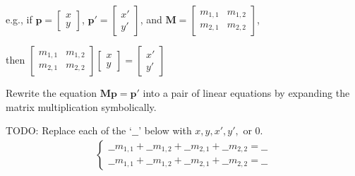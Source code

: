 \documentclass{csci1430}
\begin{document}
\begin{question}[points=10,drawbox=false]
e.g., if 
$\mathbf{p} = \begin{bmatrix} x \\ y \end{bmatrix}$, 
$\mathbf{p'} = \begin{bmatrix} x' \\ y' \end{bmatrix}$,
and 
$\mathbf{M} = \begin{bmatrix} m_{1,1} & m_{1,2} \\ m_{2,1} & m_{2,2} \end{bmatrix}$,

then $\begin{bmatrix} m_{1,1} & m_{1,2} \\ m_{2,1} & m_{2,2} \end{bmatrix} \begin{bmatrix} x \\ y \end{bmatrix} = \begin{bmatrix} x' \\ y'  \end{bmatrix}$

\end{question}

\begin{subquestion}[points=1]
Rewrite the equation $\mathbf{M}\mathbf{p} = \mathbf{p'}$ into a pair of linear equations by expanding the matrix multiplication symbolically.
\end{subquestion}

\begin{answer}
TODO: Replace each of the `$\_\_$' below with $x, y, x', y',$ or $0$.
\begin{align*}
\begin{cases}
    \_\_m_{1,1} + \_\_m_{1,2} + \_\_m_{2,1} + \_\_m_{2,2} = \_\_
    \\\_\_m_{1,1} + \_\_m_{1,2} + \_\_m_{2,1} + \_\_m_{2,2} = \_\_
\end{cases}
\end{align*}
\end{answer}
\end{document}

